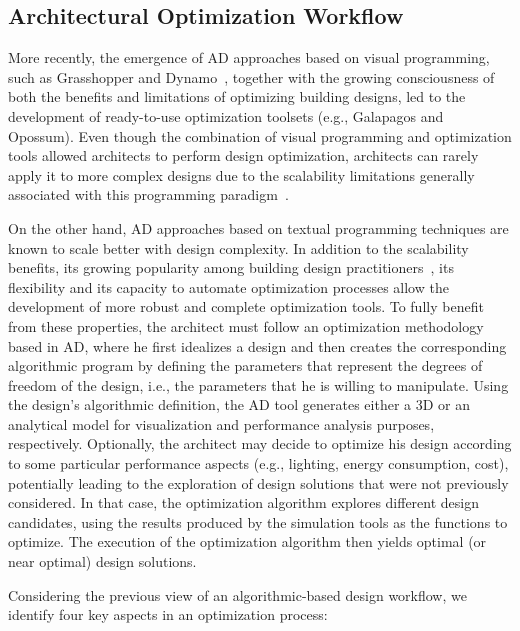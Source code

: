 \subsection{Architectural Optimization Workflow}
\label{ssec:AOW}
More recently, the emergence of \ac{AD} approaches based on visual programming, such as Grasshopper and Dynamo~\cite{GRASSHOPPER,DYNAMOBIM}, together with the growing consciousness of both the benefits and limitations of optimizing building designs, led to the development of ready-to-use optimization toolsets (e.g., Galapagos and Opossum). Even though the combination of visual programming and optimization tools allowed architects to perform design optimization, architects can rarely apply it to more complex designs due to the scalability limitations generally associated with this programming paradigm~\cite{Heijden2015}.

On the other hand, \ac{AD} approaches based on textual programming techniques are known to scale better with design complexity. In addition to the scalability benefits, its growing popularity among building design practitioners~\cite{Kestelier2013}, its flexibility and its capacity to automate optimization processes allow the development of more robust and complete optimization tools. To fully benefit from these properties, the architect must follow an optimization methodology based in \ac{AD}, where he first idealizes a design and then creates the corresponding algorithmic program by defining the parameters that represent the degrees of freedom of the design, i.e., the parameters that he is willing to manipulate. Using the design's algorithmic definition, the \ac{AD} tool generates either a 3D or an analytical model for visualization and performance analysis purposes, respectively. Optionally, the architect may decide to optimize his design according to some particular performance aspects (e.g., lighting, energy consumption, cost), potentially leading to the exploration of design solutions that were not previously considered. In that case, the optimization algorithm explores different design candidates, using the results produced by the simulation tools as the functions to optimize. The execution of the optimization algorithm then yields optimal (or near optimal) design solutions.

Considering the previous view of an algorithmic-based design workflow, we identify four key aspects in an optimization process:

